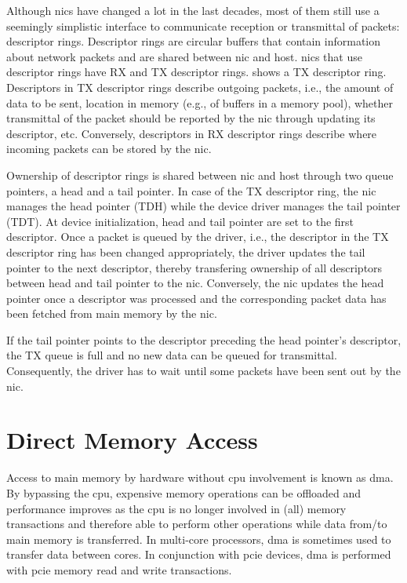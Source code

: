 Although \acp{nic} have changed a lot in the last decades, most of them still
use a seemingly simplistic interface to communicate reception or transmittal of
packets: descriptor rings. Descriptor rings are circular buffers that contain
information about network packets and are shared between \ac{nic} and host.
\acp{nic} that use descriptor rings have RX and TX descriptor rings.
 shows a TX descriptor ring. Descriptors in TX descriptor
rings describe outgoing packets, i.e., the amount of data to be sent, location
in memory (e.g., of buffers in a memory pool), whether transmittal of the packet
should be reported by the \ac{nic} through updating its descriptor, etc.
Conversely, descriptors in RX descriptor rings describe where incoming packets
can be stored by the \ac{nic}.

Ownership of descriptor rings is shared between \ac{nic} and host through two
queue pointers, a head and a tail pointer. In case of the TX descriptor ring,
the \ac{nic} manages the head pointer (TDH) while the device driver manages the
tail pointer (TDT). At device initialization, head and tail pointer are set to
the first descriptor. Once a packet is queued by the driver, i.e., the
descriptor in the TX descriptor ring has been changed appropriately, the driver
updates the tail pointer to the next descriptor, thereby transfering ownership
of all descriptors between head and tail pointer to the \ac{nic}. Conversely,
the \ac{nic} updates the head pointer once a descriptor was processed and the
corresponding packet data has been fetched from main memory by the \ac{nic}.

If the tail pointer points to the descriptor preceding the head pointer's
descriptor, the TX queue is full and no new data can be queued for transmittal.
Consequently, the driver has to wait until some packets have been sent out by
the \ac{nic}.


\section{Direct Memory Access}
\label{sec:dma}

Access to main memory by hardware without \ac{cpu} involvement is known as
\acf{dma}. By bypassing the \ac{cpu}, expensive memory operations can be
offloaded and performance improves as the \ac{cpu} is no longer involved in
(all) memory transactions and therefore able to perform other operations while
data from/to main memory is transferred. In multi-core processors, \ac{dma} is
sometimes used to transfer data between cores. In conjunction with \ac{pcie}
devices, \ac{dma} is performed with \ac{pcie} memory read and write
transactions.

